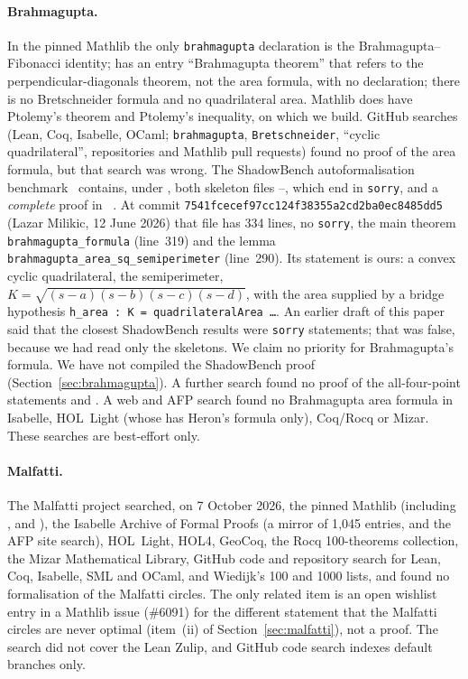 \documentclass[11pt]{article}
\theoremstyle{definition}
\theoremstyle{remark}
\newcommand{\lean}[1]{\texttt{#1}}
\begin{document}
\paragraph{Brahmagupta.} In the pinned Mathlib the only \lean{brahmagupta} declaration is the
Brahmagupta--Fibonacci identity;  has an entry ``Brahmagupta theorem'' that
refers to the perpendicular-diagonals theorem, not the area formula, with no declaration; there is
no Bretschneider formula and no quadrilateral area. Mathlib does have Ptolemy's theorem and
Ptolemy's inequality, on which we build. GitHub searches (Lean, Coq, Isabelle, OCaml; \lean{brahmagupta},
\lean{Bretschneider}, ``cyclic quadrilateral'', repositories and Mathlib pull requests) found no proof
of the area formula, but that search was wrong. The ShadowBench autoformalisation
benchmark~\cite{ShadowBench} contains, under
, both skeleton files
--, which end in \lean{sorry}, and a
\emph{complete} proof in ~\cite{ShadowBenchProof}. At commit
\texttt{7541fcecef97cc124f38355a2cd2ba0ec8485dd5} (Lazar Milikic, 12 June 2026) that file has
334 lines, no \lean{sorry}, the main theorem \lean{brahmagupta\_formula} (line~319) and the lemma
\lean{brahmagupta\_area\_sq\_semiperimeter} (line~290). Its statement is ours: a convex cyclic
quadrilateral, the semiperimeter, $K=\sqrt{(s-a)(s-b)(s-c)(s-d)}$, with the area supplied by a
bridge hypothesis \lean{h\_area : K = quadrilateralArea \ldots}. An earlier draft of this paper
said that the closest ShadowBench results were \lean{sorry} statements; that was false, because
we had read only the skeletons. We claim no priority for Brahmagupta's formula. We have not
compiled the ShadowBench proof (Section~\ref{sec:brahmagupta}). A further search found no proof
of the all-four-point statements  and
. A web and AFP search found no Brahmagupta area formula
in Isabelle, HOL~Light (whose  has Heron's formula only), Coq/Rocq or Mizar.
These searches are best-effort only.

\paragraph{Malfatti.} The Malfatti project searched, on 7 October 2026, the pinned Mathlib
(including ,  and ), the Isabelle Archive of
Formal Proofs (a mirror of 1{,}045 entries, and the AFP site search), HOL~Light, HOL4, GeoCoq, the
Rocq 100-theorems collection, the Mizar Mathematical Library, GitHub code and repository search
for Lean, Coq, Isabelle, SML and OCaml, and Wiedijk's 100 and 1000 lists, and found no
formalisation of the Malfatti circles. The only related item is an open wishlist entry in a
Mathlib issue (\#6091) for the different statement that the Malfatti circles are never optimal
(item~(ii) of Section~\ref{sec:malfatti}), not a proof. The search did not cover the Lean Zulip,
and GitHub code search indexes default branches only.
\end{document}
